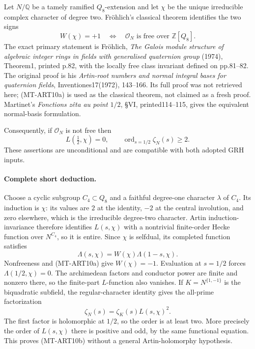 Let $N/\mathbb Q$ be a tamely ramified $Q_8$-extension and let
$\chi$ be the unique irreducible complex character of degree two.
Fr\"ohlich's classical theorem identifies the two signs
\[
 W(\chi)=+1\quad\Longleftrightarrow\quad
       \mathcal O_N\text{ is free over }\mathbb Z[Q_8].
 \tag{MT-ART10a}
\]
The exact primary statement is Fr\"ohlich, \emph{The Galois
module structure of algebraic integer rings in fields with
generalised quaternion group} (1974), Theorem1, printed p.82,
with the locally free class invariant defined on pp.81--82.
The original proof is his \emph{Artin-root numbers and normal
integral bases for quaternion fields}, Inventiones17(1972),
143--166. Its full proof was not retrieved here; (MT-ART10a)
is used as the classical theorem, not claimed as a fresh proof.
Martinet's \emph{Fonctions z\^eta au point $1/2$}, \S VI,
printed114--115, gives the equivalent normal-basis formulation.

Consequently, if $\mathcal O_N$ is not free then
\[
 L(\tfrac12,\chi)=0,
 \qquad \operatorname{ord}_{s=1/2}\zeta_N(s)\ge2.
 \tag{MT-ART10b}
\]
These assertions are unconditional and are compatible with
both adopted GRH inputs.

\paragraph{Complete short deduction.}
Choose a cyclic subgroup $C_4\subset Q_8$ and a faithful
degree-one character $\lambda$ of $C_4$. Its induction is
$\chi$: its values are $2$ at the identity, $-2$ at the central
involution, and zero elsewhere, which is the irreducible
degree-two character. Artin induction-invariance therefore
identifies $L(s,\chi)$ with a nontrivial finite-order Hecke
function over $N^{C_4}$, so it is entire. Since $\chi$ is
selfdual, its completed function satisfies
\[
                 \Lambda(s,\chi)=W(\chi)\Lambda(1-s,\chi).
\]
Nonfreeness and (MT-ART10a) give $W(\chi)=-1$. Evaluation at
$s=1/2$ forces $\Lambda(1/2,\chi)=0$. The archimedean factors
and conductor power are finite and nonzero there, so the
finite-part $L$-function also vanishes. If $K=N^{\{1,-1\}}$
is the biquadratic subfield, the regular-character identity
gives the all-prime factorization
\[
                         \zeta_N(s)=\zeta_K(s)L(s,\chi)^2.
\]
The first factor is holomorphic at $1/2$, so the order is at
least two. More precisely the order of $L(s,\chi)$ there is
positive and odd, by the same functional equation. This proves
(MT-ART10b) without a general Artin-holomorphy hypothesis.

